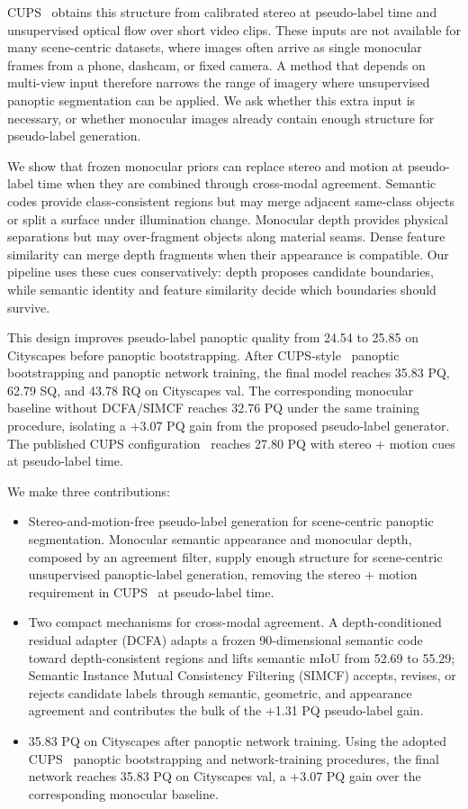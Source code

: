 \documentclass{article}
\begin{document}
CUPS~\cite{hahn2025cups} obtains this structure from calibrated stereo at pseudo-label time and unsupervised optical flow over short video clips. These inputs are not available for many scene-centric datasets, where images often arrive as single monocular frames from a phone, dashcam, or fixed camera. A method that depends on multi-view input therefore narrows the range of imagery where unsupervised panoptic segmentation can be applied. We ask whether this extra input is necessary, or whether monocular images already contain enough structure for pseudo-label generation.

We show that frozen monocular priors can replace stereo and motion at pseudo-label time when they are combined through cross-modal agreement. Semantic codes provide class-consistent regions but may merge adjacent same-class objects or split a surface under illumination change. Monocular depth provides physical separations but may over-fragment objects along material seams. Dense feature similarity can merge depth fragments when their appearance is compatible. Our pipeline uses these cues conservatively: depth proposes candidate boundaries, while semantic identity and feature similarity decide which boundaries should survive.

This design improves pseudo-label panoptic quality from 24.54 to 25.85 on Cityscapes before panoptic bootstrapping. After CUPS-style~\cite{hahn2025cups} panoptic bootstrapping and panoptic network training, the final model reaches 35.83 PQ, 62.79 SQ, and 43.78 RQ on Cityscapes val. The corresponding monocular baseline without DCFA/SIMCF reaches 32.76 PQ under the same training procedure, isolating a +3.07 PQ gain from the proposed pseudo-label generator. The published CUPS configuration~\cite{hahn2025cups} reaches 27.80 PQ with stereo + motion cues at pseudo-label time.

We make three contributions:
\begin{itemize}
\item Stereo-and-motion-free pseudo-label generation for scene-centric panoptic segmentation. Monocular semantic appearance and monocular depth, composed by an agreement filter, supply enough structure for scene-centric unsupervised panoptic-label generation, removing the stereo + motion requirement in CUPS~\cite{hahn2025cups} at pseudo-label time.
\item Two compact mechanisms for cross-modal agreement. A depth-conditioned residual adapter (DCFA) adapts a frozen 90-dimensional semantic code toward depth-consistent regions and lifts semantic mIoU from 52.69 to 55.29; Semantic Instance Mutual Consistency Filtering (SIMCF) accepts, revises, or rejects candidate labels through semantic, geometric, and appearance agreement and contributes the bulk of the +1.31 PQ pseudo-label gain.
\item 35.83 PQ on Cityscapes after panoptic network training. Using the adopted CUPS~\cite{hahn2025cups} panoptic bootstrapping and network-training procedures, the final network reaches 35.83 PQ on Cityscapes val, a +3.07 PQ gain over the corresponding monocular baseline.
\end{itemize}
\end{document}

